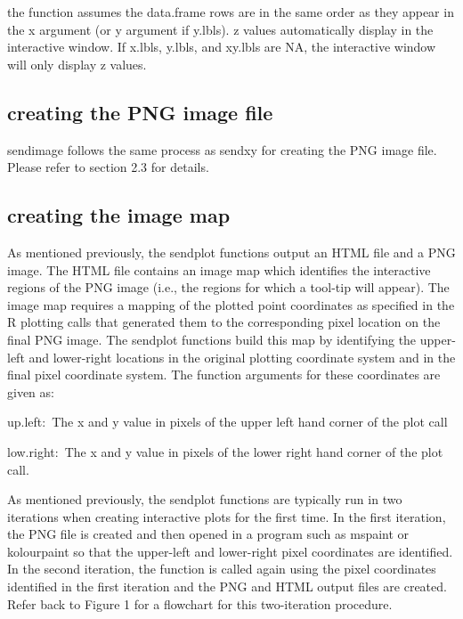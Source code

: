 \documentclass[]{article}
\begin{document}
 the function assumes the data.frame rows are in the same order as they appear in the x argument (or y argument if y.lbls).  \newline
{} z values automatically display in the interactive window. If x.lbls, y.lbls, and xy.lbls are NA, the interactive window will only display z values. 


\subsection{creating the PNG image file}

\indent sendimage follows the same process as sendxy for creating the PNG image file. Please refer to section 2.3 for details.

\subsection{creating the image map}

As mentioned previously, the sendplot functions output an HTML file and a PNG image. The HTML file contains an image map which identifies the interactive regions of the PNG image (i.e., the regions for which a tool-tip will appear). The image map requires a mapping of the plotted point coordinates as specified in the R plotting calls that generated them to the corresponding pixel location on the final PNG image. The sendplot functions build this map by identifying the upper-left and lower-right locations in the original plotting coordinate system and in the final pixel coordinate system. The function arguments for these coordinates are given as:
\begin{description}
  \item{up.left:~}{The x and y value in pixels of the upper left hand
    corner of the plot call}
  \item{low.right:~}{The x and y value in pixels of the lower right hand
    corner of the plot call.}
\end{description}

\indent As mentioned previously, the sendplot functions are typically run in two iterations when creating interactive plots for the first time. In the first iteration, the PNG file is created and then opened in a program such as mspaint or kolourpaint so that the upper-left and lower-right pixel coordinates are identified. In the second iteration, the function is called again using the pixel coordinates identified in the first iteration and the PNG and HTML output files are created.  Refer back to Figure 1 for a flowchart for this two-iteration procedure. 
\end{document}
